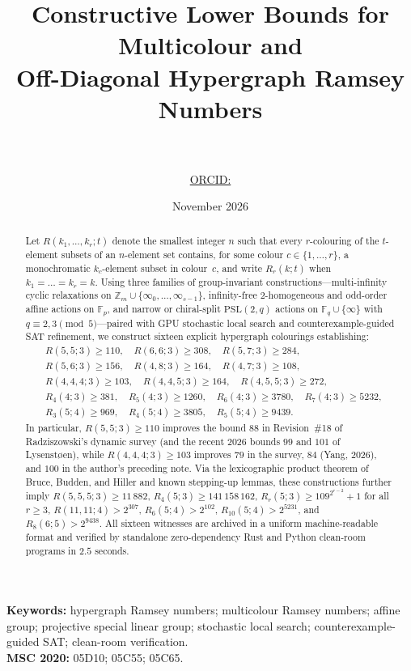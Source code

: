 \documentclass[11pt]{article}
\title{\bfseries Constructive Lower Bounds for Multicolour and\\ Off-Diagonal Hypergraph Ramsey Numbers}
\author{\AuthorName\\[4pt]
\small \AuthorAffiliation\\[2pt]
\small\texttt{\AuthorEmail} \;\textperiodcentered\; \href{https://orcid.org/\AuthorORCID}{ORCID: \texttt{\AuthorORCID}}}
\date{November 2026}
\theoremstyle{remark}
\newcommand{\F}{\mathbb{F}}
\newcommand{\Z}{\mathbb{Z}}
\begin{document}
\maketitle

\begin{abstract}
Let $R(k_1,\dots,k_r;t)$ denote the smallest integer $n$ such that every
$r$-colouring of the $t$-element subsets of an $n$-element set contains, for
some colour $c\in\{1,\dots,r\}$, a monochromatic $k_c$-element subset in
colour~$c$, and write $R_r(k;t)$ when $k_1=\dots=k_r=k$. Using three families of
group-invariant constructions---multi-infinity cyclic relaxations on
$\Z_m\cup\{\infty_0,\dots,\infty_{s-1}\}$, infinity-free $2$-homogeneous and
odd-order affine actions on $\F_p$, and narrow or chiral-split
$\mathrm{PSL}(2,q)$ actions on $\F_q\cup\{\infty\}$ with $q\equiv 2,3\pmod 5$---paired
with GPU stochastic local search and counterexample-guided SAT refinement, we
construct sixteen explicit hypergraph colourings establishing:
\begin{align*}
  &R(5,5;3)\ge 110,\quad R(6,6;3)\ge 308,\quad R(5,7;3)\ge 284,\\
  &R(5,6;3)\ge 156,\quad R(4,8;3)\ge 164,\quad R(4,7;3)\ge 108,\\
  &R(4,4,4;3)\ge 103,\quad R(4,4,5;3)\ge 164,\quad R(4,5,5;3)\ge 272,\\
  &R_4(4;3)\ge 381,\quad R_5(4;3)\ge 1260,\quad R_6(4;3)\ge 3780,\quad
   R_7(4;3)\ge 5232,\\
  &R_3(5;4)\ge 969,\quad R_4(5;4)\ge 3805,\quad R_5(5;4)\ge 9439.
\end{align*}
In particular, $R(5,5;3)\ge 110$ improves the bound $88$ in Revision~\#18 of
Radziszowski's dynamic survey (and the recent 2026 bounds $99$ and $101$ of
Lysenst{\o}en), while $R(4,4,4;3)\ge 103$ improves $79$ in the survey, $84$
(Yang, 2026), and $100$ in the author's preceding note. Via the lexicographic
product theorem of Bruce, Budden, and Hiller and known stepping-up lemmas, these
constructions further imply $R(5,5,5;3)\ge 11\,882$,
$R_4(5;3)\ge 141\,158\,162$, $R_r(5;3)\ge 109^{2^{r-2}}+1$ for all $r\ge 3$,
$R(11,11;4)>2^{307}$, $R_6(5;4)>2^{102}$, $R_{10}(5;4)>2^{5231}$, and
$R_8(6;5)>2^{9438}$. All sixteen witnesses are archived in a uniform
machine-readable format and verified by standalone zero-dependency Rust and
Python clean-room programs in $2.5$ seconds.
\end{abstract}

\medskip
\noindent\textbf{Keywords:} hypergraph Ramsey numbers; multicolour Ramsey
numbers; affine group; projective special linear group; stochastic local search;
counterexample-guided SAT; clean-room verification.\\
\textbf{MSC 2020:} 05D10; 05C55; 05C65.
\end{document}
